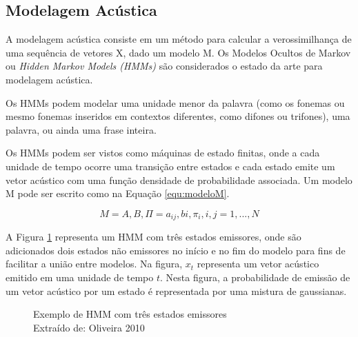 \documentclass[12pt,a4paper,oneside]{report}
\begin{document}
\subsection{Modelagem Acústica}

A modelagem acústica consiste em um método para calcular a verossimilhança de uma sequência de vetores X, dado um modelo M. Os Modelos Ocultos de Markov ou \emph{Hidden Markov Models (HMMs)} são considerados o estado da arte para modelagem acústica.

Os HMMs podem modelar uma unidade menor da palavra (como os fonemas ou mesmo fonemas inseridos em contextos diferentes, como difones ou trifones), uma palavra, ou ainda uma frase inteira.

Os HMMs podem ser vistos como máquinas de estado finitas, onde a cada unidade de tempo ocorre uma transição entre estados e cada estado emite um vetor acústico com uma função densidade de probabilidade associada. Um modelo M pode ser escrito como na Equação \ref{equ:modeloM}.

\begin{equation}
M = A,B,\Pi = a_{ij} , bi, \pi_{i}, i, j = 1, ...,N
\label{equ:modeloM}
\end{equation}

A Figura \ref{fig:exemploHMM} representa um HMM com três estados emissores, onde são adicionados dois estados não emissores no início e no fim do modelo para fins de facilitar a união entre modelos. Na figura, $x_t$ representa um vetor acústico emitido em uma unidade de tempo $t$. Nesta figura, a probabilidade de emissão de um vetor acústico por um estado é representada por uma mistura de gaussianas.

\begin{figure}[h!]
\centering
{}\caption{Exemplo de HMM com três estados emissores \\ \footnotesize * Extraído de: Oliveira 2010 \cite{fravisphinx}}
\label{fig:exemploHMM}
\end{figure}
\end{document}
